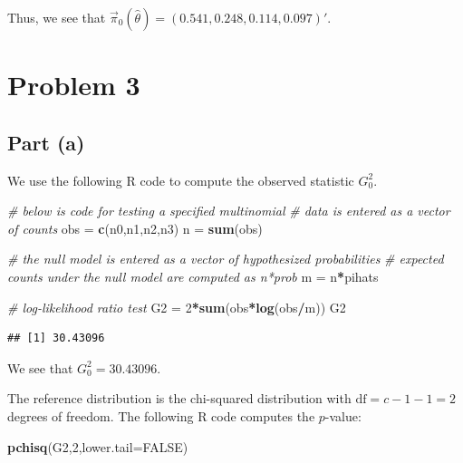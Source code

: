 \documentclass[
]{article}
\newenvironment{Shaded}{\begin{snugshade}}{\end{snugshade}}
\newcommand{\AttributeTok}[1]{\textcolor[rgb]{0.13,0.29,0.53}{#1}}
\newcommand{\CommentTok}[1]{\textcolor[rgb]{0.56,0.35,0.01}{\textit{#1}}}
\newcommand{\ConstantTok}[1]{\textcolor[rgb]{0.56,0.35,0.01}{#1}}
\newcommand{\DecValTok}[1]{\textcolor[rgb]{0.00,0.00,0.81}{#1}}
\newcommand{\FunctionTok}[1]{\textcolor[rgb]{0.13,0.29,0.53}{\textbf{#1}}}
\newcommand{\NormalTok}[1]{#1}
\newcommand{\OtherTok}[1]{\textcolor[rgb]{0.56,0.35,0.01}{#1}}
\newcommand{\SpecialCharTok}[1]{\textcolor[rgb]{0.81,0.36,0.00}{\textbf{#1}}}
\begin{document}
Thus, we see that
\(\vec{\pi}_{0}(\hat\theta) = (0.541,0.248,0.114,0.097)'\).

\hypertarget{problem-3}{%
\section{Problem 3}\label{problem-3}}

\hypertarget{part-a}{%
\subsection{Part (a)}\label{part-a}}


We use the following R code to compute the observed statistic \(G_0^2\).

\begin{Shaded}
\begin{Highlighting}[]
\CommentTok{\# below is code for testing a specified multinomial}
\CommentTok{\# data is entered as a vector of counts}
\NormalTok{obs }\OtherTok{=} \FunctionTok{c}\NormalTok{(n0,n1,n2,n3)}
\NormalTok{n }\OtherTok{=} \FunctionTok{sum}\NormalTok{(obs)}

\CommentTok{\# the null model is entered as a vector of hypothesized probabilities}
\CommentTok{\# expected counts under the null model are computed as n*prob}
\NormalTok{m }\OtherTok{=}\NormalTok{ n}\SpecialCharTok{*}\NormalTok{pihats}

\CommentTok{\# log{-}likelihood ratio test}
\NormalTok{G2 }\OtherTok{=} \DecValTok{2}\SpecialCharTok{*}\FunctionTok{sum}\NormalTok{(obs}\SpecialCharTok{*}\FunctionTok{log}\NormalTok{(obs}\SpecialCharTok{/}\NormalTok{m))}
\NormalTok{G2}
\end{Highlighting}
\end{Shaded}

\begin{verbatim}
## [1] 30.43096
\end{verbatim}

We see that \(G_0^2 = 30.43096\).

The reference distribution is the chi-squared distribution with
\(\mathrm{df}=c-1-1=2\) degrees of freedom. The following R code
computes the \(p\)-value:

\begin{Shaded}
\begin{Highlighting}[]
\FunctionTok{pchisq}\NormalTok{(G2,}\DecValTok{2}\NormalTok{,}\AttributeTok{lower.tail=}\ConstantTok{FALSE}\NormalTok{)}
\end{Highlighting}
\end{Shaded}
\end{document}
